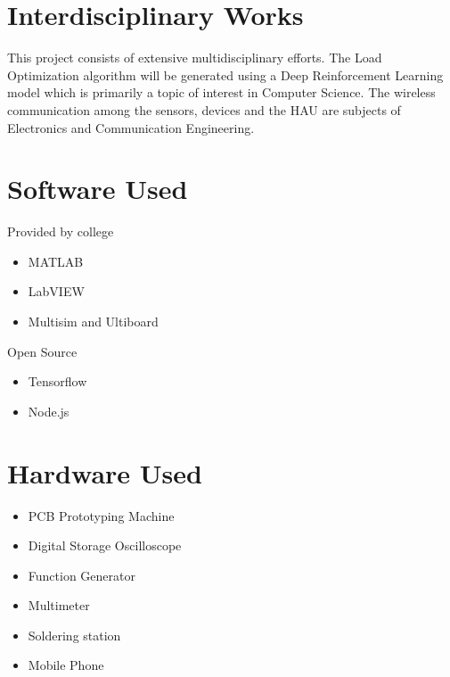\documentclass[12pt,a4paper,titlepage,twoside]{article}
\begin{document}
        \section{Interdisciplinary Works}
        This project consists of extensive multidisciplinary efforts.
        The Load Optimization algorithm will be generated using a Deep Reinforcement Learning model which is primarily a topic of interest in Computer Science.
        The wireless communication among the sensors, devices and the HAU are subjects of Electronics and Communication Engineering.\\
        
        \section{Software Used}	
            Provided by college
            \begin{itemize}
                \item MATLAB
                \item LabVIEW
                \item Multisim and Ultiboard
            \end{itemize}
            Open Source
            \begin{itemize}
                \item Tensorflow
                \item Node.js
            \end{itemize}
        \section{Hardware Used}
            \begin{itemize}
                \item PCB Prototyping Machine
                \item Digital Storage Oscilloscope
                \item Function Generator
                \item Multimeter
                \item Soldering station
                \item Mobile Phone
            \end{itemize}
        
\end{document}

